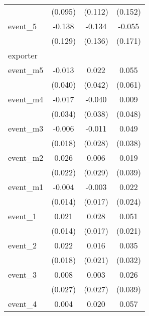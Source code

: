{\begin{tabular}{l*{3}{c}}
            &     (0.095)         &     (0.112)         &     (0.152)         \\
[1em]
event\_5     &      -0.138         &      -0.134         &      -0.055         \\
            &     (0.129)         &     (0.136)         &     (0.171)         \\
\hline
exporter    &                     &                     &                     \\
event\_m5    &      -0.013         &       0.022         &       0.055         \\
            &     (0.040)         &     (0.042)         &     (0.061)         \\
[1em]
event\_m4    &      -0.017         &      -0.040         &       0.009         \\
            &     (0.034)         &     (0.038)         &     (0.048)         \\
[1em]
event\_m3    &      -0.006         &      -0.011         &       0.049         \\
            &     (0.018)         &     (0.028)         &     (0.038)         \\
[1em]
event\_m2    &       0.026         &       0.006         &       0.019         \\
            &     (0.022)         &     (0.029)         &     (0.039)         \\
[1em]
event\_m1    &      -0.004         &      -0.003         &       0.022         \\
            &     (0.014)         &     (0.017)         &     (0.024)         \\
[1em]
event\_1     &       0.021         &       0.028         &       0.051\sym{*}  \\
            &     (0.014)         &     (0.017)         &     (0.021)         \\
[1em]
event\_2     &       0.022         &       0.016         &       0.035         \\
            &     (0.018)         &     (0.021)         &     (0.032)         \\
[1em]
event\_3     &       0.008         &       0.003         &       0.026         \\
            &     (0.027)         &     (0.027)         &     (0.039)         \\
[1em]
event\_4     &       0.004         &       0.020         &       0.057         \\

\end{tabular}}

